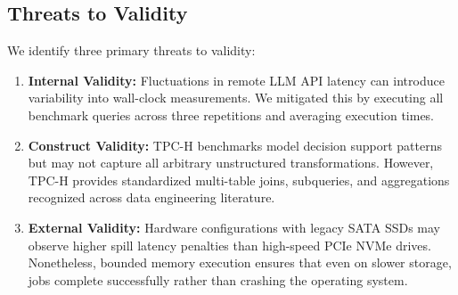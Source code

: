 \subsection{Threats to Validity}
We identify three primary threats to validity:
\begin{enumerate}
    \item \textbf{Internal Validity:} Fluctuations in remote LLM API latency can introduce variability into wall-clock measurements. We mitigated this by executing all benchmark queries across three repetitions and averaging execution times.
    \item \textbf{Construct Validity:} TPC-H benchmarks model decision support patterns but may not capture all arbitrary unstructured transformations. However, TPC-H provides standardized multi-table joins, subqueries, and aggregations recognized across data engineering literature.
    \item \textbf{External Validity:} Hardware configurations with legacy SATA SSDs may observe higher spill latency penalties than high-speed PCIe NVMe drives. Nonetheless, bounded memory execution ensures that even on slower storage, jobs complete successfully rather than crashing the operating system.
\end{enumerate}
